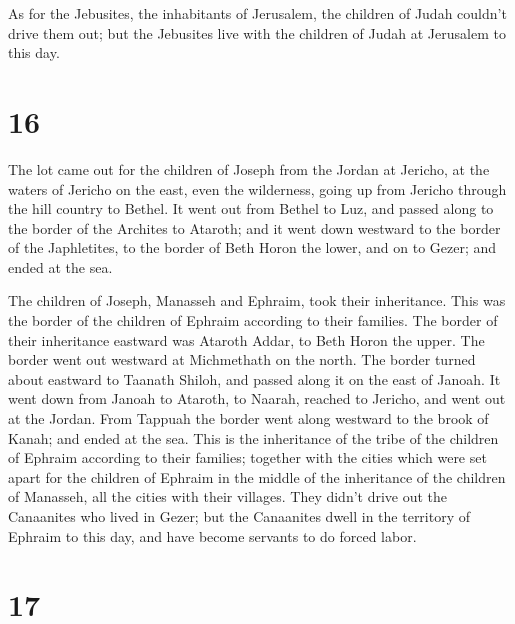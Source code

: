  As for the Jebusites, the inhabitants of Jerusalem, the
children of Judah couldn't drive them out; but the Jebusites live with
the children of Judah at Jerusalem to this day.

\hypertarget{section-15}{%
\section{16}\label{section-15}}

 The lot came out for the children of Joseph from the
Jordan at Jericho, at the waters of Jericho on the east, even the
wilderness, going up from Jericho through the hill country to Bethel.
 It went out from Bethel to Luz, and passed along to the
border of the Archites to Ataroth;  and it went down
westward to the border of the Japhletites, to the border of Beth Horon
the lower, and on to Gezer; and ended at the sea.

 The children of Joseph, Manasseh and Ephraim, took their
inheritance.  This was the border of the children of
Ephraim according to their families. The border of their inheritance
eastward was Ataroth Addar, to Beth Horon the upper.  The
border went out westward at Michmethath on the north. The border turned
about eastward to Taanath Shiloh, and passed along it on the east of
Janoah.  It went down from Janoah to Ataroth, to Naarah,
reached to Jericho, and went out at the Jordan.  From
Tappuah the border went along westward to the brook of Kanah; and ended
at the sea. This is the inheritance of the tribe of the children of
Ephraim according to their families;  together with the
cities which were set apart for the children of Ephraim in the middle of
the inheritance of the children of Manasseh, all the cities with their
villages.  They didn't drive out the Canaanites who lived
in Gezer; but the Canaanites dwell in the territory of Ephraim to this
day, and have become servants to do forced labor.

\hypertarget{section-16}{%
\section{17}\label{section-16}}

